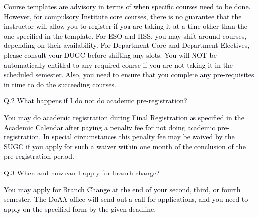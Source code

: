 \documentclass[12pt]{article}
\begin{document}
\vspace{\baselineskip}
\begin{justify}
{\fontsize{10pt}{12.0pt}\selectfont \textcolor[HTML]{00000A}{Course templates are advisory in terms of when specific courses need to be done. However, for compulsory Institute core courses, there is no guarantee that the instructor will allow you to register if you are taking it at a time other than the one specified in the template. For ESO and HSS, you may shift around courses, depending on their availability. For Department Core and Department Electives, please consult your DUGC before shifting any slots. You will NOT be automatically entitled to any required course if you are not taking it in the scheduled semester. Also, you need to ensure that you complete any pre-requisites in time to do the succeeding courses.}\par}
\end{justify}\par


\vspace{\baselineskip}
{\fontsize{10pt}{12.0pt}\selectfont \textcolor[HTML]{00000A}{Q.2 What happens if I do not do academic pre-registration?}\par}\par


\vspace{\baselineskip}
\begin{justify}
{\fontsize{10pt}{12.0pt}\selectfont \textcolor[HTML]{00000A}{You may do academic registration during Final Registration as specified in the Academic Calendar after paying a penalty fee for not doing academic pre-registration. In special circumstances this penalty fee may be waived by the SUGC if you apply for such a waiver within one month of the conclusion of the pre-registration period.}\par}
\end{justify}\par


\vspace{\baselineskip}
{\fontsize{10pt}{12.0pt}\selectfont \textcolor[HTML]{00000A}{Q.3 When and how can I apply for branch change?}\par}\par


\vspace{\baselineskip}
\begin{adjustwidth}{0.0in}{0.01in}
\begin{justify}
{\fontsize{10pt}{12.0pt}\selectfont \textcolor[HTML]{00000A}{You may apply for Branch Change at the end of your second, third, or fourth semester. The DoAA office will send out a call for applications, and you need to apply on the specified form by the given deadline.}\par}
\end{justify}\par

\end{adjustwidth}
\end{document}
